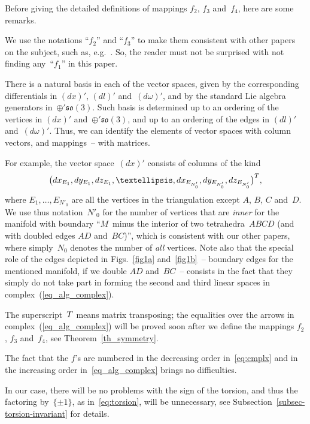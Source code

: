 \documentclass[11pt]{article}
\begin{document}
Before giving the detailed def\/initions of mappings $f_2$, $f_3$ and~$f_4$, here are some remarks.
\begin{remark}
We use the notations ``$f_2$'' and ``$f_3$'' to make them consistent with other papers on the subject, such as, e.g.~\cite{M,M-thesis}. So, the reader must not be surprised with not f\/inding any~``$f_1$'' in this paper.
\end{remark}
\begin{remark}
\label{rem-b}
There is a natural basis in each of the vector spaces, given by the corresponding dif\/ferentials in $(dx)'$, $(dl)'$ and~$(d\omega)'$, and by the standard Lie algebra generators in~$\oplus' \mathfrak{so}(3)$. Such basis is determined up to an ordering of the vertices in $(dx)'$ and~$\oplus' \mathfrak{so}(3)$, and up to an ordering of the edges in $(dl)'$ and~$(d\omega)'$. Thus, we can identify the elements of vector spaces with column vectors, and mappings~-- with matrices.

For example, the vector space~$(dx)'$ consists of columns of the kind
\begin{displaymath}
\big(dx_{E_1}, dy_{E_1}, dz_{E_1}, \ldots, dx_{E_{N'_0}}, dy_{E_{N'_0}}, dz_{E_{N'_0}}\big)^{\rm T},
\end{displaymath}
where $E_1,\ldots,E_{N'_0}$ are all the vertices in the triangulation except $A$, $B$, $C$ and~$D$. We use thus notation~$N'_0$ for the number of vertices that are \emph{inner} for the manifold with boundary ``$M$~minus the interior of two tetrahedra~$ABCD$ (and with doubled edges $AD$ and~$BC$)'', which is consistent with our other papers, where simply~$N_0$ denotes the number of \emph{all} vertices. Note also that the special role of the edges depicted in Figs.~\ref{fig1a} and~\ref{fig1b}~-- boundary edges for the mentioned manifold, if we double $AD$ and~$BC$~-- consists in the fact that they simply do not take part in forming the second and third linear spaces in complex~(\ref{eq_alg_complex}).
\end{remark}
\begin{remark}
The superscript~$\rm T$ means matrix transposing; the equalities over the arrows in complex~(\ref{eq_alg_complex}) will be proved soon after we def\/ine the mappings $f_2$, $f_3$ and~$f_4$, see Theorem~\ref{th_symmetry}.
\end{remark}
\begin{remark}
The fact that the $f$'s are numbered in the decreasing order in~\eqref{eq:cmplx} and in the increasing order in~\eqref{eq_alg_complex} brings no dif\/f\/iculties.
\end{remark}
\begin{remark}
In our case, there will be no problems with the sign of the torsion, and thus the factoring by~$\{ \pm 1 \}$, as in~\eqref{eq:torsion}, will be unnecessary, see Subsection~\ref{subsec-torsion-invariant} for details.
\end{remark}
\end{document}
